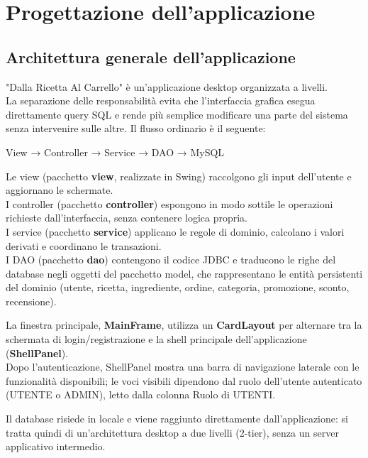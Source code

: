 \chapter{Progettazione dell'applicazione}

\section{Architettura generale dell'applicazione}

"Dalla Ricetta Al Carrello" è un'applicazione desktop organizzata a livelli. \\
La separazione delle responsabilità evita che l'interfaccia grafica esegua direttamente query SQL e rende più semplice modificare una parte del sistema senza intervenire sulle altre. Il flusso ordinario è il seguente:

View → Controller → Service → DAO → MySQL

Le view (pacchetto \textbf{view}, realizzate in Swing) raccolgono gli input dell'utente e aggiornano le schermate.\\
I controller (pacchetto \textbf{controller}) espongono in modo sottile le operazioni richieste dall'interfaccia, senza contenere logica propria.\\
I service (pacchetto \textbf{service}) applicano le regole di dominio, calcolano i valori derivati e coordinano le transazioni.\\
I DAO (pacchetto \textbf{dao}) contengono il codice JDBC e traducono le righe del database negli oggetti del pacchetto model, che rappresentano le entità persistenti del dominio (utente, ricetta, ingrediente, ordine, categoria, promozione, sconto, recensione).

La finestra principale, \textbf{MainFrame}, utilizza un \textbf{CardLayout} per alternare tra la schermata di login/registrazione e la shell principale dell'applicazione (\textbf{ShellPanel}).\\
Dopo l'autenticazione, ShellPanel mostra una barra di navigazione laterale con le funzionalità disponibili; le voci visibili dipendono dal ruolo dell'utente autenticato (UTENTE o ADMIN), letto dalla colonna Ruolo di UTENTI.

Il database risiede in locale e viene raggiunto direttamente dall'applicazione: si tratta quindi di un'architettura desktop a due livelli (2-tier), senza un server applicativo intermedio.
\vspace{1em}

